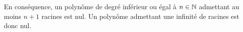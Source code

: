 \documentclass{magnolia}
\begin{document}
\begin{remarques}
\remarque En conséquence, un polynôme de degré inférieur ou égal à $n\in\mathbb{N}$ admettant au moins $n+1$ racines est nul.
\remarque Un polynôme admettant une infinité de racines est donc nul.
\end{remarques}


\end{document}

